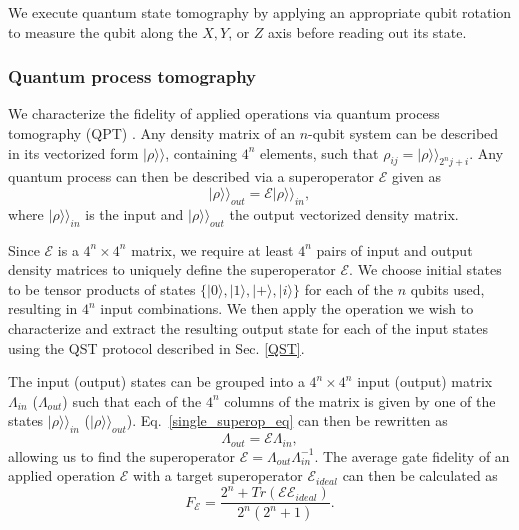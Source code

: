 \documentclass[12pt]{article}
\newcommand{\ket}[1]{\ensuremath{|{#1}\rangle}}
\begin{document}
We execute quantum state tomography by applying an appropriate qubit rotation to measure the qubit along the $X, Y$, or $Z$ axis before reading out its state.

\subsubsection{Quantum process tomography}
We characterize the fidelity of applied operations via quantum process tomography (QPT) \cite{mohseni2008quantum}. Any density matrix of an $n$-qubit system can be described in its vectorized form $\vert \rho \rangle\rangle$, containing $4^n$ elements, such that $\rho_{ij} = \vert \rho \rangle\rangle_{2^nj+i}$. Any quantum process can then be described via a superoperator $\mathcal{E}$ given as
\begin{equation}
\label{single_superop_eq}
\vert \rho \rangle\rangle_{out} = \mathcal{E} \vert \rho \rangle\rangle_{in},
\end{equation}
where $\vert \rho \rangle\rangle_{in}$ is the input and $\vert \rho \rangle\rangle_{out}$ the output vectorized density matrix.

Since $\mathcal{E}$ is a $4^n \times 4^n$ matrix, we require at least $4^n$ pairs of input and output density matrices to uniquely define the superoperator $\mathcal{E}$. We choose initial states to be tensor products of states $\{\ket{0}, \ket{1}, \ket{+}, \ket{i}\}$ for each of the $n$ qubits used, resulting in $4^n$ input combinations. We then apply the operation we wish to characterize and extract the resulting output state for each of the input states using the QST protocol described in Sec. \ref{QST}.

The input (output) states can be grouped into a $4^n \times 4^n$ input (output) matrix $\Lambda_{in}$ ($\Lambda_{out}$) such that each of the $4^n$ columns of the matrix is given by one of the states $\vert \rho \rangle\rangle_{in}$ ($\vert \rho \rangle\rangle_{out}$). Eq.~\ref{single_superop_eq} can then be rewritten as
\begin{equation}
\label{superop_eq}
\Lambda_{out} = \mathcal{E} \Lambda_{in},
\end{equation}
allowing us to find the superoperator $\mathcal{E} = \Lambda_{out} \Lambda_{in}^{-1}$. The average gate fidelity of an applied operation $\mathcal{E}$ with a target superoperator $\mathcal{E}_{ideal}$ can then be calculated as \cite{pedersen2007fidelity}
\begin{equation}
\label{avg_gate_fid}
F_{\mathcal{E}} = \frac{2^n+Tr(\mathcal{E}\mathcal{E}_{ideal})}{2^n(2^n+1)}.
\end{equation}
\end{document}
